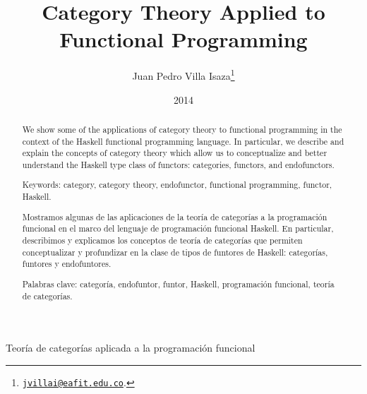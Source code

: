 \documentclass[11pt,letterpaper]{article}
\theoremstyle{definition}
\begin{document}
\title{Category Theory Applied to Functional Programming}

\author{Juan Pedro Villa Isaza\thanks{
    \href{mailto:jvillai@eafit.edu.co}{\nolinkurl{jvillai@eafit.edu.co}}.}}

\date{2014}

\maketitle

\begin{abstract}

  We show some of the applications of category theory to functional
  programming in the context of the Haskell functional programming
  language. In particular, we describe and explain the concepts of
  category theory which allow us to conceptualize and better
  understand the Haskell type class of functors: categories, functors,
  and endofunctors.

  \vspace{1em}
  \noindent
  Keywords: category, category theory, endofunctor, functional
  programming, functor, Haskell.

\end{abstract}

\begin{spanish}

  \begin{center}

    {\Large Teoría de categorías aplicada a la programación funcional}

  \end{center}

  \begin{abstract}

    Mostramos algunas de las aplicaciones de la teoría de categorías a
    la programación funcional en el marco del lenguaje de programación
    funcional Haskell. En particular, describimos y explicamos los
    conceptos de teoría de categorías que permiten conceptualizar y
    profundizar en la clase de tipos de funtores de Haskell:
    categorías, funtores y endofuntores.

    \vspace{1em}
    \noindent
    Palabras clave: categoría, endofuntor, funtor, Haskell,
    programación funcional, teoría de categorías.

  \end{abstract}

\end{spanish}
\end{document}
